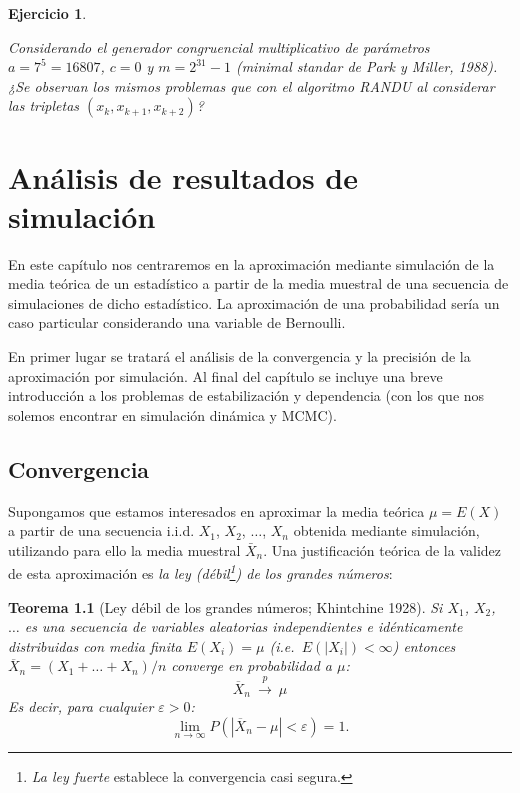 \documentclass[
]{book}
\theoremstyle{break}
\newtheorem{theorem}{Teorema}[chapter]
\newtheorem{exercise}{Ejercicio}[chapter]
\theoremstyle{nonumberplain}
\begin{document}
\begin{exercise}
\protect\hypertarget{exr:parkmiller}{}\label{exr:parkmiller}

Considerando el generador congruencial multiplicativo de parámetros \(a=7^{5}=16807\), \(c=0\) y \(m=2^{31}-1\) (\emph{minimal standar} de Park y Miller, 1988).
¿Se observan los mismos problemas que con el algoritmo RANDU al considerar las tripletas \((x_{k},x_{k+1},x_{k+2})\)?
\end{exercise}

\hypertarget{resultados}{%
\chapter{Análisis de resultados de simulación}\label{resultados}}

En este capítulo nos centraremos en la aproximación mediante simulación de la media teórica de un estadístico a partir de la media muestral de una secuencia de simulaciones de dicho estadístico.
La aproximación de una probabilidad sería un caso particular considerando una variable de Bernoulli.

En primer lugar se tratará el análisis de la convergencia y la precisión de la aproximación por simulación.
Al final del capítulo se incluye una breve introducción a los problemas de estabilización y dependencia (con los que nos solemos encontrar en simulación dinámica y MCMC).

\hypertarget{convergencia}{%
\section{Convergencia}\label{convergencia}}

Supongamos que estamos interesados en aproximar la media teórica \(\mu = E\left( X\right)\) a partir de una secuencia i.i.d. \(X_{1}\), \(X_{2}\), \(\ldots\), \(X_{n}\) obtenida mediante simulación, utilizando para ello la media muestral \(\bar{X}_{n}\).
Una justificación teórica de la validez de esta aproximación es \emph{la ley (débil\footnote{\emph{La ley fuerte} establece la convergencia casi segura.}) de los grandes números}:

\begin{theorem}[Ley débil de los grandes números; Khintchine 1928]
\protect\hypertarget{thm:khinchine}{}\label{thm:khinchine}
Si \(X_{1}\), \(X_{2}\), \(\ldots\) es una secuencia de variables aleatorias independientes e idénticamente distribuidas con media finita \(E\left( X_{i}\right) =\mu\) (i.e.~\(E\left( \left\vert X_{i} \right\vert \right) < \infty\)) entonces \(\overline{X}_{n}=\left( X_{1}+\ldots +X_{n}\right) /n\)
converge en probabilidad a \(\mu\): \[\overline{X}_{n}\ \overset{p}{ \longrightarrow }\ \mu\]
Es decir, para cualquier \(\varepsilon >0\):
\[\lim\limits_{n\rightarrow \infty }P\left( \left\vert \overline{X}_{n}-\mu
\right\vert <\varepsilon \right) = 1.\]
\end{theorem}
\end{document}
